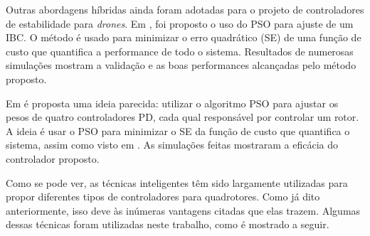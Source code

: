 Outras abordagens híbridas ainda foram adotadas para o projeto de controladores de estabilidade para \textit{drones}. Em \cite{Yacef2013}, foi proposto o uso do PSO para ajuste de um IBC. O método é usado para minimizar o erro quadrático (SE) de uma função de custo que quantifica a performance de todo o sistema. Resultados de numerosas simulações mostram a validação e as boas performances alcançadas pelo método proposto.

Em \cite{Boubertakh2013} é proposta uma ideia parecida: utilizar o algoritmo PSO para ajustar os pesos de quatro controladores PD, cada qual responsável por controlar um rotor. A ideia é usar o PSO para minimizar o SE da função de custo que quantifica o sistema, assim como visto em \cite{Yacef2013}. As simulações feitas mostraram a eficácia do controlador proposto.

Como se pode ver, as técnicas inteligentes têm sido largamente utilizadas para propor diferentes tipos de controladores para quadrotores. Como já dito anteriormente, isso deve às inúmeras vantagens citadas que elas trazem. Algumas dessas técnicas foram utilizadas neste trabalho, como é mostrado a seguir.